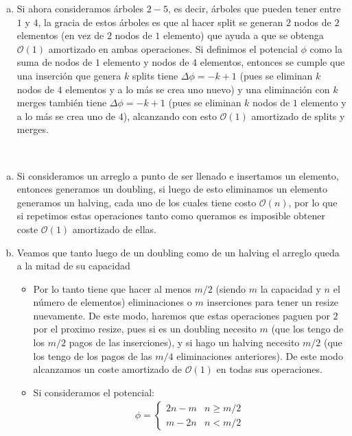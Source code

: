 \documentclass[dcc,uchile]{fcfmcourse}
\begin{document}
\begin{problems}
\begin{enumerate}[a)]
    \item Si ahora consideramos árboles $2-5$, es decir, árboles que pueden tener entre $1$ y $4$, la gracia de estos árboles es que al hacer split se generan $2$ nodos de $2$ elementos (en vez de $2$ nodos de $1$ elemento) que ayuda a que se obtenga $\mathcal{O}(1)$ amortizado en ambas operaciones. Si definimos el potencial $\phi$ como la suma de nodos de $1$ elemento y nodos de $4$ elementos, entonces se cumple que una inserción que genera $k$ splits tiene $\Delta \phi = -k+1$ (pues se eliminan $k$ nodos de $4$ elementos y a lo más se crea uno nuevo) y una eliminación con $k$ merges también tiene $\Delta \phi = -k+1$ (pues se eliminan $k$ nodos de $1$ elemento y a lo más se crea uno de $4$), alcanzando con esto $\mathcal{O}(1)$ amortizado de splits y merges.
\end{enumerate}
\\
\begin{enumerate}[a)]
    \item Si consideramos un arreglo a punto de ser llenado e insertamos un elemento, entonces generamos un doubling, si luego de esto eliminamos un elemento generamos un halving, cada uno de los cuales tiene costo $\mathcal{O}(n)$, por lo que si repetimos estas operaciones tanto como queramos es imposible obtener coste $\mathcal{O}(1)$ amortizado de ellas.
    \item Veamos que tanto luego de un doubling como de un halving el arreglo queda a la mitad de su capacidad 
    \begin{itemize}
        \item Por lo tanto tiene que hacer al menos $m/2$ (siendo $m$ la capacidad y $n$ el número de elementos) eliminaciones o $m$ inserciones para tener un resize nuevamente. De este modo, haremos que estas operaciones paguen por $2$ por el proximo resize, pues si es un doubling necesito $m$ (que los tengo de los $m/2$ pagos de las inserciones), y si hago un halving necesito $m/2$ (que los tengo de los pagos de las $m/4$ eliminaciones anteriores). De este modo alcanzamos un coste amortizado de $\mathcal{O}(1)$ en todas sus operaciones.
        \item Si consideramos el potencial:
        \begin{align*}
            \phi =
            \begin{cases}
            2n - m & n\ge m/2\\
            m - 2n & n < m/2
            \end{cases}

\end{align*}
\end{itemize}
\end{enumerate}
\end{problems}
\end{document}
